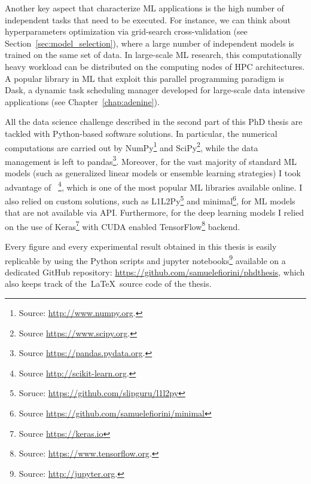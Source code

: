 Another key aspect that characterize ML applications is the high number of independent tasks that need to be executed. For instance, we can think about hyperparameters optimization via grid-search cross-validation (see Section~\ref{sec:model_selection}), where a large number of independent models is trained on the same set of data.
In large-scale ML research, this computationally heavy workload can be distributed on the computing nodes of HPC architectures.
A popular library in ML that exploit this parallel programming paradigm is Dask, a dynamic task scheduling manager developed for large-scale data intensive applications (see Chapter~\ref{chap:adenine}).

All the data science challenge described in the second part of this PhD thesis are tackled with Python-based software solutions. In particular, the numerical computations are carried out by {\sc NumPy}\footnote{ Source: \url{http://www.numpy.org}.} and {\sc SciPy}\footnote{ Source \url{https://www.scipy.org}.}, while the data management is left to {\sc pandas}\footnote{ Source \url{https://pandas.pydata.org}.}. Moreover, for the vast majority of standard ML models (such as generalized linear models or ensemble learning strategies) I took advantage of \sklearn~\cite{scikit-learn}\footnote{ Source \url{http://scikit-learn.org}.}, which is one of the most popular ML libraries available online.
I also relied on custom solutions, such as {\sc L1L2Py}\footnote{ Soruce: \url{https://github.com/slipguru/l1l2py}} and {\sc minimal}\footnote{ Source \url{https://github.com/samuelefiorini/minimal}}, for ML models that are not available via \sklearn API.
Furthermore, for the deep learning models I relied on the use of {\sc Keras}\footnote{ Source \url{https://keras.io}} with CUDA enabled {\sc TensorFlow}\footnote{ Source: \url{https://www.tensorflow.org}.} backend.

Every figure and every experimental result obtained in this thesis is easily replicable by using the Python scripts and {\sc jupyter}  notebooks\footnote{ Source: \url{http://jupyter.org}.} available on a dedicated GitHub repository: \url{https://github.com/samuelefiorini/phdthesis}, which also keeps track of the~\LaTeX~source code of the thesis.